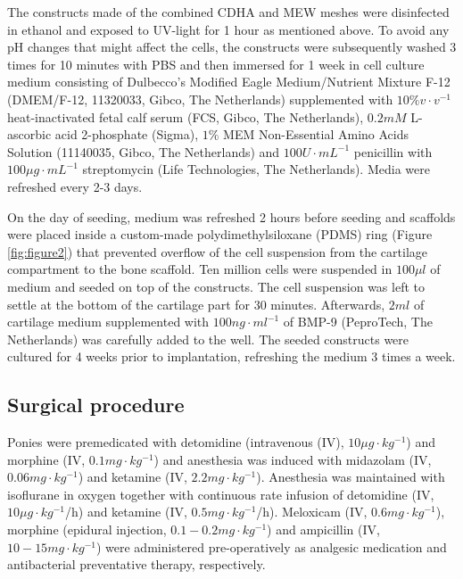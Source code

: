 \documentclass[twocolumn, empirical, authordate, issue]{jote-new-article}
\begin{document}
The constructs made of the combined CDHA and MEW meshes were disinfected in ethanol and exposed to UV-light for 1 hour as mentioned above. To avoid any pH changes that might affect the cells, the constructs were subsequently washed 3 times for 10 minutes with PBS and then immersed for 1 week in cell culture medium consisting of Dulbecco's Modified Eagle Medium/Nutrient Mixture F-12 (DMEM/F-12, 11320033, Gibco, The Netherlands) supplemented with $10\% v\cdot v^{-1}$
heat-inactivated fetal calf serum (FCS, Gibco, The Netherlands), $0.2 mM$ L-ascorbic acid 2-phosphate (Sigma), $1\%$ MEM Non-Essential Amino Acids Solution (11140035, Gibco, The Netherlands) and $100 U\cdot mL^{-1}$ penicillin with $100 \mu g\cdot mL^{-1}$
streptomycin (Life Technologies, The Netherlands). Media were refreshed every 2-3 days.

On the day of seeding, medium was refreshed 2 hours before seeding and scaffolds were placed inside a custom-made polydimethylsiloxane (PDMS) ring (Figure \ref{fig:figure2}) that prevented overflow of the cell suspension from the cartilage compartment to the bone scaffold. Ten million cells were suspended in $100 \mu l$ of medium and seeded on top of the constructs. The cell suspension was left to settle at the bottom of the cartilage part for 30 minutes. Afterwards, $2 ml$ of cartilage medium supplemented with $ 100 ng\cdot ml^{-1} $ of BMP-9 (PeproTech, The Netherlands) was carefully added to the well. The seeded constructs were cultured for 4 weeks prior to implantation, refreshing the medium 3 times a week.




\subsection{Surgical procedure} 

Ponies were premedicated with detomidine (intravenous (IV), $ 10 \mu g\cdot kg^{-1} $) and morphine (IV,  $0.1 mg\cdot kg^{-1} $) and anesthesia was induced with midazolam (IV, $ 0.06 mg\cdot kg^{-1} $) and ketamine (IV, $ 2.2 mg\cdot kg^{-1} $). Anesthesia was maintained with isoflurane in oxygen together with continuous rate infusion of detomidine (IV, $ 10 \mu g\cdot kg^{-1} $/h) and ketamine (IV, $ 0.5 mg\cdot kg^{-1} $/h). Meloxicam (IV, $ 0.6 mg\cdot kg^{-1} $), morphine (epidural injection, $0.1 - 0.2 mg\cdot kg^{-1} $) and ampicillin (IV, $10 - 15 mg\cdot kg^{-1} $) were administered pre-operatively as analgesic medication and antibacterial preventative therapy, respectively.
\end{document}
